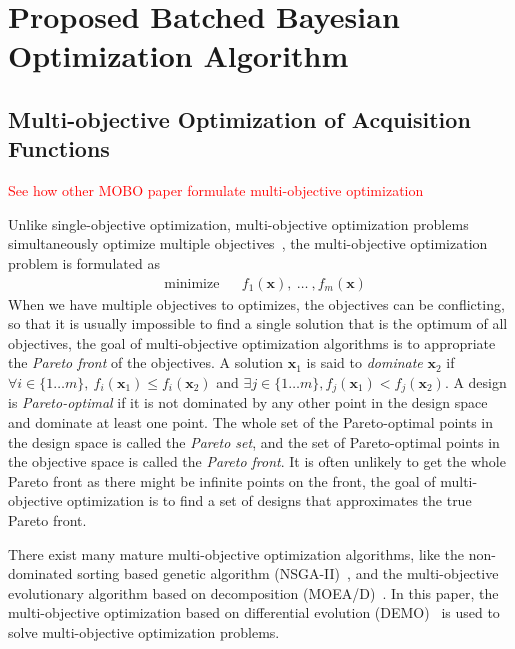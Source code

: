 \section{Proposed Batched Bayesian Optimization Algorithm}

\subsection{Multi-objective Optimization of Acquisition Functions}\label{sec:MOForumlation}

\textcolor{red}{See how other MOBO paper formulate multi-objective optimization}

Unlike single-objective optimization, multi-objective optimization problems
simultaneously optimize multiple objectives~\cite{MO_overview}, the
multi-objective optimization problem is formulated as
\begin{equation}
    \label{eq:MOFormulation}
    \begin{aligned}
        & \text{minimize} & & f_1(\bm{x}),~\dots~,f_m(\bm{x})
    \end{aligned}
\end{equation}
When we have multiple objectives to optimizes, the objectives can be conflicting, so that it is usually impossible to find a single solution that is the optimum of all objectives, the goal of multi-objective optimization algorithms is to appropriate the \emph{Pareto front} of the objectives. A solution $\bm{x}_1$ is said to \emph{dominate} $\bm{x}_2$ if $\forall i \in \{1\dots m\},~f_i(\bm{x}_1) \le f_i(\bm{x}_2)$ and $\exists j \in \{1\dots m\}, f_j(\bm{x}_1) < f_j(\bm{x}_2)$. A design is \emph{Pareto-optimal} if it is not dominated by any other point in the design space and dominate at least one point. The whole set of the Pareto-optimal points in the design space is called the \emph{Pareto set}, and the set of Pareto-optimal points in the objective space is called the \emph{Pareto front}. It is often unlikely to get the whole Pareto front as there might be infinite points on the front, the goal of multi-objective optimization is to find a set of designs that approximates the true Pareto front.

There exist many mature multi-objective optimization algorithms, like the
non-dominated sorting based genetic algorithm (NSGA-II)~\cite{nsgaii}, and the
multi-objective evolutionary algorithm based on decomposition
(MOEA/D)~\cite{moead}. In this paper, the multi-objective optimization based on
differential evolution (DEMO)~\cite{demo} is used to solve multi-objective
optimization problems.

